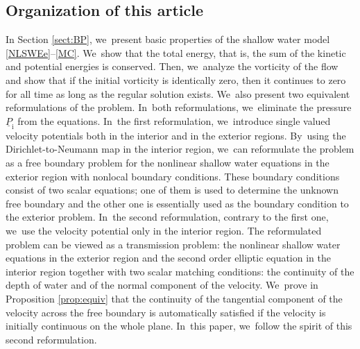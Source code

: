 \documentclass[10pt]{amsart}
\newcommand{\ul}[1]{\underline{#1}}
\theoremstyle{definition}
\begin{document}
\subsection{Organization of this article}
In Section \ref{sect:BP}, we~present basic properties of the shallow water model \eqref{NLSWEe}--\eqref{MC}. We~show that the total energy, that is, the sum of the kinetic and potential energies is conserved.
Then, we~analyze the vorticity of the flow and show that if the initial vorticity is identically zero,
then it continues to zero for all time as long as the regular solution exists. We~also present two equivalent reformulations of the problem. In~both reformulations, we~eliminate the pressure $\ul{P}_\mathrm{i}$ from the equations. In~the first reformulation, we~introduce single valued velocity potentials both in the interior and in the exterior regions. By~using the Dirichlet-to-Neumann map in the interior region, we~can reformulate the problem as a free boundary problem for the nonlinear shallow water equations
in the exterior region with nonlocal boundary conditions.
These boundary conditions consist of two scalar equations;
one of them is used to determine the unknown free boundary and the other one is essentially used as the boundary condition to the exterior problem. In~the second reformulation, contrary to the first one, we~use the velocity potential only in the interior region.
The reformulated problem can be viewed as a transmission problem:
the nonlinear shallow water equations in the exterior region and the second order elliptic equation in the interior region
together with two scalar matching conditions: the continuity of the depth of water and of the normal component of the velocity. We~prove in Proposition \ref{prop:equiv} that the continuity of the tangential component of the velocity across the free boundary is automatically satisfied
if the velocity is initially continuous on the whole plane. In~this paper, we~follow the spirit of this second reformulation.
\end{document}
